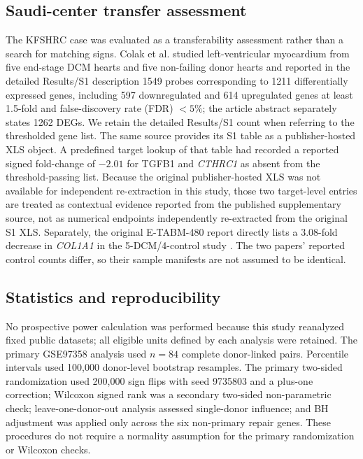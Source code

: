 \documentclass[preprint,11pt]{elsarticle}
\newcommand{\cthrc}{\textit{CTHRC1}}
\begin{document}
\subsection{Saudi-center transfer assessment}
The KFSHRC case was evaluated as a transferability assessment rather than a search for matching signs. Colak et al. \cite{Colak2016} studied left-ventricular myocardium from five end-stage DCM hearts and five non-failing donor hearts and reported in the detailed Results/S1 description 1549 probes corresponding to 1211 differentially expressed genes, including 597 downregulated and 614 upregulated genes at least 1.5-fold and false-discovery rate (FDR) $<5\%$; the article abstract separately states 1262 DEGs. We retain the detailed Results/S1 count when referring to the thresholded gene list. The same source provides its S1 table as a publisher-hosted XLS object. A predefined target lookup of that table had recorded a reported signed fold-change of $-2.01$ for TGFB1 and \cthrc{} as absent from the threshold-passing list. Because the original publisher-hosted XLS was not available for independent re-extraction in this study, those two target-level entries are treated as contextual evidence reported from the published supplementary source, not as numerical endpoints independently re-extracted from the original S1 XLS. Separately, the original E-TABM-480 report directly lists a 3.08-fold decrease in \textit{COL1A1} in the 5-DCM/4-control study \cite{Colak2009}. The two papers' reported control counts differ, so their sample manifests are not assumed to be identical.


\subsection{Statistics and reproducibility}
No prospective power calculation was performed because this study reanalyzed fixed public datasets; all eligible units defined by each analysis were retained. The primary GSE97358 analysis used $n=84$ complete donor-linked pairs. Percentile intervals used 100,000 donor-level bootstrap resamples. The primary two-sided randomization used 200,000 sign flips with seed 9735803 and a plus-one correction; Wilcoxon signed rank was a secondary two-sided non-parametric check; leave-one-donor-out analysis assessed single-donor influence; and BH adjustment was applied only across the six non-primary repair genes. These procedures do not require a normality assumption for the primary randomization or Wilcoxon checks.
\end{document}
